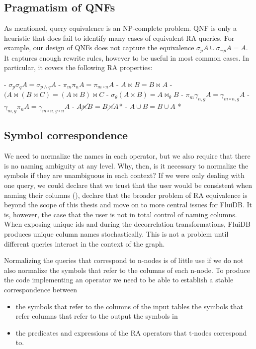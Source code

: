 \subsection{Pragmatism of QNFs}

As mentioned, query equivalence is an NP-complete problem. QNF is only
a heuristic that does fail to identify many cases of equivalent RA
queries.  For example, our design of QNFs does not capture the
equivalence \(\sigma_p A \cup \sigma_{\neg p} A = A\). It captures
enough rewrite rules, however to be useful in most common cases. In
particular, it covers the following RA properties:

- \(\sigma_p \sigma_q A = \sigma_{p \land q} A\)
- \(\pi_m \pi_{n} A = \pi_{m \circ n} A\)
- \(A \Join B = B \Join A\)
- \((A \Join (B \Join C) = (A \Join B) \Join C\)
- \(\sigma_\theta (A \times B) = A \Join_\theta B\)
- \(\pi_m \gamma_{n,g} A = \gamma_{m \circ n,g} A \)
- \(\gamma_{m,g} \pi_n A = \gamma_{m \circ n,g \circ n} A \)
- \(A \cancel\ltimes B = B \cancel\rtimes A \)*
- \(A \cup B = B \cup A \) *

\subsection{Symbol correspondence}
\label{sec:symbol_correspondence}

We need to normalize the names in each operator, but we also require
that there is no naming ambiguity at any level. Why, then, is it necessary
to normalize the symbols if they are unambiguous in each context? If
we were only dealing with one query, we could declare that we trust
that the user would be consistent when naming their columns
(), declare that the broader problem
of RA equivalence is beyond the scope of this thesis and move on to
more central issues for FluiDB. It is, however, the case that the user is not in
total control of naming columns. When exposing
unique ids and during the decorrelation transformations, FluiDB
produces unique column names stochastically. This is not a
problem until different queries interact in the context of the
graph.


Normalizing the queries that correspond to n-nodes is of little use
if we do not also normalize the symbols that refer to the columns
of each n-node. To produce the code implementing
an operator we need to be able to establish a stable correspondence
between

\begin{itemize}
\item the symbols that refer to the columns of the input tables the
  symbols that refer columns that refer to the output the symbols in
\item the predicates and expressions of the RA operators that t-nodes
  correspond to.
\end{itemize}

